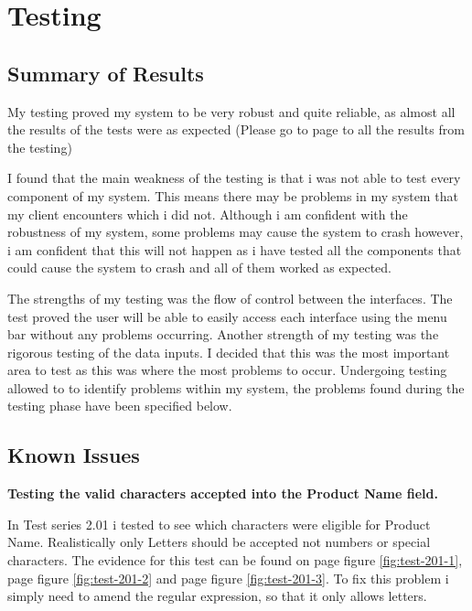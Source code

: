 \pagebreak 

\section{Testing}

\subsection{Summary of Results}

My testing proved my system to be very robust and quite reliable, as almost all the results of the tests were as expected (Please go to page \pageref{fig:actual-results} to all the results from the testing)

I found that the main weakness of the testing is that i was not able to test every component of my system. This means there may be problems in my system that my client encounters which i did not. Although i am confident with the robustness of my system, some problems may cause the system to crash however, i am confident that this will not happen as i have tested all the components that could cause the system to crash and all of them worked as expected.

The strengths of my testing was the flow of control between the interfaces. The test proved the user will be able to easily access each interface using the menu bar without any problems occurring. Another strength of my testing was the rigorous testing of the data inputs. I decided that this was the most important area to test as this was where the most problems to occur. Undergoing testing allowed to to identify problems within my system, the problems found during the testing phase have been specified below.

\subsection{Known Issues}

\textbf{Testing the valid characters accepted into the Product Name field.}

In Test series 2.01 i tested to see which characters were eligible for Product Name. Realistically only Letters should be accepted not numbers or special characters. The evidence for this test can be found on page \pageref{fig:test-201-1} figure \ref{fig:test-201-1}, page \pageref{fig:test-201-2} figure \ref{fig:test-201-2} and  page \pageref{fig:test-201-3} figure \ref{fig:test-201-3}. To fix this problem i simply need to amend the regular expression, so that it only allows letters. 




